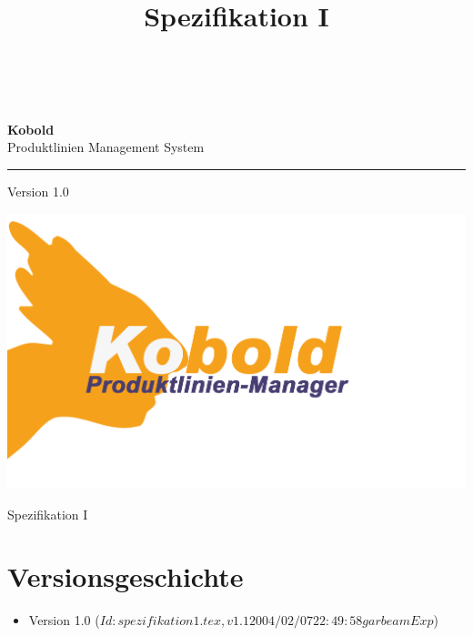 \documentclass[a4paper,titlepage,12pt,ngerman]{scrbook}
\title {\huge \product\\[0.5cm]\large Spezifikation I \\[0.5cm] \version
  \\[1cm] \Large \company}
\newcommand\version{Version 1.0\xspace}
\begin{document}

\begin{titlepage}
\renewcommand{\thefootnote}{\fnsymbol{footnote}}
{\Huge
\raggedright
\textbf{\bf Kobold} \\
\huge Produktlinien Management System
\rule{\textwidth}{0.75pt}
\par
}
\begin{flushleft}
\normalsize
\version
\end{flushleft}

\vspace*{3cm}
\begin{center}
\includegraphics[width=15cm]{../common/logo-color.png}
\end{center}
\vfill

{\parindent=0cm
\Huge Spezifikation I
}


\setcounter{footnote}{0}
\end{titlepage}


\section*{Versionsgeschichte}

\begin{itemize}

\item Version 1.0  ($Id: spezifikation1.tex,v 1.1 2004/02/07 22:49:58 garbeam Exp $)


\end{itemize}


\tableofcontents


\appendix

\end{document}
